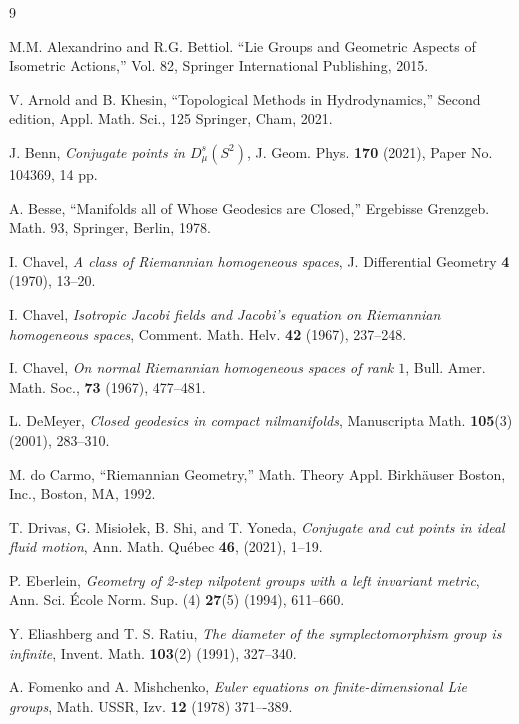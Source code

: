 \documentclass[oneside, 11pt]{amsart}
\numberwithin{equation}{section}
\begin{document}
\begin{thebibliography}{9}

M.M. Alexandrino and R.G. Bettiol. ``Lie Groups and Geometric Aspects of Isometric Actions,'' Vol. 82, Springer International Publishing, 2015.

V. Arnold and B. Khesin, ``Topological Methods in Hydrodynamics,'' Second edition, Appl. Math. Sci., 125 Springer, Cham, 2021. %


J. Benn, \emph{Conjugate points in $D_{\mu}^s(S^2)$}, J. Geom. Phys. \textbf{170} (2021), Paper No. 104369, 14 pp.


A. Besse, ``Manifolds all of Whose Geodesics are Closed,''  Ergebisse Grenzgeb. Math. 93, Springer, Berlin, 1978.

I. Chavel, \emph{A class of Riemannian homogeneous spaces}, J. Differential Geometry \textbf{4} (1970), 13--20.

I. Chavel, \emph{Isotropic Jacobi fields and Jacobi’s equation on Riemannian homogeneous spaces}, Comment.
Math. Helv. \textbf{42} (1967), 237--248.

I. Chavel, \emph{On normal Riemannian homogeneous spaces of rank $1$}, Bull. Amer. Math. Soc., \textbf{73} (1967), 477--481.

L. DeMeyer, \emph{Closed geodesics in compact nilmanifolds},  Manuscripta Math. \textbf{105}(3) (2001), 283--310.  

M. do Carmo, ``Riemannian Geometry,'' Math. Theory Appl. Birkh\"auser Boston, Inc., Boston, MA, 1992. 

T. Drivas, G. Misio\l ek, B. Shi, and T. Yoneda, \emph{Conjugate and cut points in ideal fluid motion}, Ann. Math. Qu\'ebec \textbf{46}, (2021), 1--19.

P. Eberlein, \emph{Geometry of 2-step nilpotent groups with a left invariant metric},  Ann. Sci. \'Ecole Norm. Sup. (4) \textbf{27}(5) (1994), 611--660.

Y. Eliashberg and T. S. Ratiu, \emph{The diameter of the symplectomorphism group is infinite}, Invent. Math. \textbf{103}(2) (1991), 327--340.

A. Fomenko and A. Mishchenko, \emph{Euler equations on finite-dimensional Lie groups}, 
Math. USSR, Izv.
\textbf{12} (1978) 371–-389.


\end{thebibliography}
\end{document}
